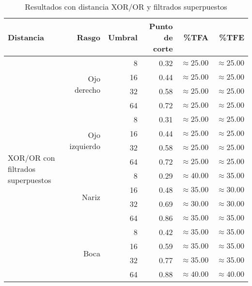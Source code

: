 \begin{table}[!hbt]
\begin{tabular}{|l|r|r|r|r|r|}
 \hline
  Distancia & Rasgo & Umbral & Punto de corte & \%TFA  & \%TFE \\
  \hline \hline
  \multirow{16}{*}{XOR/OR con filtrados superpuestos}
& \multirow{4}{*}{Ojo derecho} & 8  & 0.32 & $\approx 25.00$ & $\approx 25.00$ \\
& & 16 & 0.44 & $\approx 25.00$ & $\approx 25.00$ \\
& & 32 & 0.58 & $\approx 25.00$ & $\approx 25.00$ \\
& & 64 & 0.72 & $\approx 25.00$ & $\approx 25.00$ \\ \cline{2-6}

& \multirow{4}{*}{Ojo izquierdo} & 8  & 0.31 & $\approx 25.00$ & $\approx 25.00$ \\
& & 16 & 0.44 & $\approx 25.00$ & $\approx 25.00$ \\
& & 32 & 0.58 & $\approx 25.00$ & $\approx 25.00$ \\
& & 64 & 0.72 & $\approx 25.00$ & $\approx 25.00$ \\ \cline{2-6}

& \multirow{4}{*}{Nariz} & 8  & 0.29 & $\approx 40.00$ & $\approx 35.00$ \\
& & 16 & 0.48 & $\approx 35.00$ & $\approx 30.00$ \\
& & 32 & 0.69 & $\approx 30.00$ & $\approx 30.00$ \\
& & 64 & 0.86 & $\approx 35.00$ & $\approx 35.00$ \\ \cline{2-6}

& \multirow{4}{*}{Boca} & 8  & 0.42 & $\approx 35.00$ & $\approx 35.00$ \\
& & 16 & 0.59 & $\approx 35.00$ & $\approx 35.00$ \\
& & 32 & 0.77 & $\approx 35.00$ & $\approx 35.00$ \\
& & 64 & 0.88 & $\approx 40.00$ & $\approx 40.00$ \\ \hline

 \end{tabular}
 \caption{Resultados con distancia XOR/OR y filtrados superpuestos}
 \label{tab:xor_super}
\end{table}

